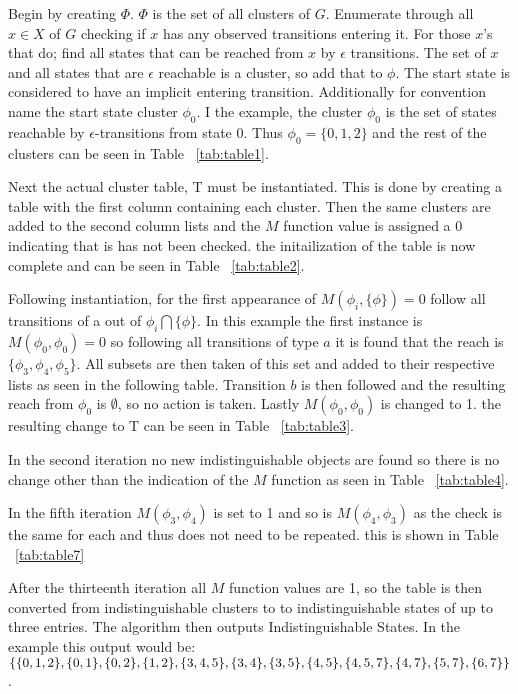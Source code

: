 \documentclass{article}
\begin{document}
				Begin by creating $\Phi$. $\Phi$ is the set of all clusters of $G$. Enumerate through all $x \in X $ of $G$ checking if $x$ has any observed transitions entering it. For those $x$'s that do; find all states that can be reached from $x$ by $\epsilon$ transitions. The set of $x$ and all states that are $\epsilon$ reachable is a cluster, so add that to $\phi$. The start state is considered to have an implicit entering transition. Additionally for convention name the start state cluster $\phi_0$. I the example, the cluster $\phi_0$ is the set of states reachable by $\epsilon$-transitions from state $0$. Thus $\phi_0 = \{0,1,2\}$ and the rest of the clusters can be seen in Table ~\ref{tab:table1}.

				Next the actual cluster table, T must be instantiated. This is done by creating a table with the first column containing each cluster. Then the same clusters are added to the second column lists and the $M$ function value is assigned a 0 indicating that is has not been checked. the initailization of the table is now complete and can be seen in Table ~\ref{tab:table2}.

				Following instantiation, for the first appearance of $M(\phi_i,\{\phi\}) = 0$ follow all transitions of a out of $\phi_i\bigcap\{\phi\}$. In this example the first instance is $M(\phi_0,\phi_0) = 0$ so following all transitions of type $a$ it is found that the reach is $\{\phi_3,\phi_4,\phi_5\}$. All subsets are then taken of this set and added to their respective lists as seen in the following table. Transition $b$ is then followed and the resulting reach from $\phi_0$ is $\emptyset$, so no action is taken. Lastly $M(\phi_0,\phi_0)$ is changed to 1. the resulting change to T can be seen in Table ~\ref{tab:table3}.

				In the second iteration no new indistinguishable objects are found so there is no change other than the indication of the $M$ function as seen in Table ~\ref{tab:table4}.

				In the fifth iteration $M(\phi_3,\phi_4)$ is set to 1 and so is $M(\phi_4,\phi_3)$ as the check is the same for each and thus does not need to be repeated. this is shown in Table ~\ref{tab:table7}

				After the thirteenth iteration all $M$ function values are 1, so the table is then converted from indistinguishable clusters to to indistinguishable states of up to three entries. The algorithm then outputs Indistinguishable States. In the example this output would be: $\{\{0,1,2\},\{0,1\},\{0,2\},\{1,2\},\{3,4,5\},\{3,4\},\{3,5\},\\\{4,5\},\{4,5,7\},\{4,7\},\{5,7\},\{6,7\}\}$.
\end{document}
